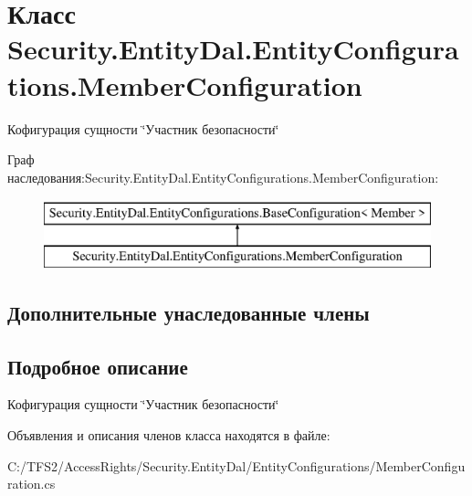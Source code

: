 \hypertarget{class_security_1_1_entity_dal_1_1_entity_configurations_1_1_member_configuration}{}\section{Класс Security.\+Entity\+Dal.\+Entity\+Configurations.\+Member\+Configuration}
\label{class_security_1_1_entity_dal_1_1_entity_configurations_1_1_member_configuration}


Кофигурация сущности \char`\"{}Участник безопасности\char`\"{}  


Граф наследования\+:Security.\+Entity\+Dal.\+Entity\+Configurations.\+Member\+Configuration\+:\begin{figure}[H]
\begin{center}
\leavevmode
\includegraphics[height=2.000000cm]{d5/d8b/class_security_1_1_entity_dal_1_1_entity_configurations_1_1_member_configuration}
\end{center}
\end{figure}
\subsection*{Дополнительные унаследованные члены}


\subsection{Подробное описание}
Кофигурация сущности \char`\"{}Участник безопасности\char`\"{} 



Объявления и описания членов класса находятся в файле\+:\begin{DoxyCompactItemize}
\item 
C\+:/\+T\+F\+S2/\+Access\+Rights/\+Security.\+Entity\+Dal/\+Entity\+Configurations/Member\+Configuration.\+cs\end{DoxyCompactItemize}
